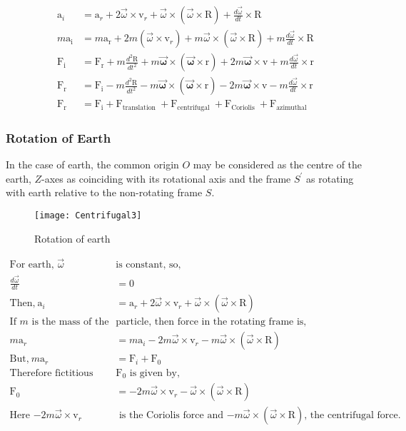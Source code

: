 \begin{align}
\mathrm{a}_{i}&=\mathrm{a}_{r}+2 \vec{\omega} \times \mathrm{v}_{r}+\vec{\omega} \times(\vec{\omega} \times \mathrm{R})+\frac{d \vec{\omega}}{d t} \times \mathrm{R}\\
m \mathrm{a_{i}} &=m \mathrm{a_{r}} +2m (\vec{\omega} \times \mathrm{v}_{r})+ m \vec{\omega} \times(\vec{\omega} \times \mathrm{R})+m \frac{d \vec{\omega}}{d t} \times \mathrm{R}\\
\mathrm{F_{i}} &=\mathrm{F_{r}}+m \frac{d^{2} \mathrm{R}}{d t^{2}}+m \boldsymbol{\vec{\omega}} \times(\boldsymbol{\vec{\omega}} \times \mathrm{r})+2 m \boldsymbol{\vec{\omega}} \times \mathrm{v}+m \frac{d \vec{\omega}}{d t} \times \mathrm{r} \\
\mathrm{F_{r}} &=\mathrm{F_{i}}-m \frac{d^{2} \mathrm{R}}{d t^{2}}-m \boldsymbol{\vec{\omega}} \times(\boldsymbol{\vec{\omega}} \times \mathrm{r})-2 m \boldsymbol{\vec{\omega}} \times \mathrm{v}-m \frac{d \vec{\omega}}{d t} \times \mathrm{r} \\
\mathrm{F_{r}} &=\mathrm{F_{i}} +\mathrm{F}_{\text {translation }}+\mathrm{F}_{\text {centrifugal }}+\mathrm{F}_{\text {Coriolis }}+\mathrm{F}_{\text {azimuthal }}
\end{align}
\subsubsection{Rotation of Earth}
In the case of earth, the common origin $O$ may be considered as the centre of the earth, $Z$-axes as coinciding with its rotational axis and the frame $S^{\prime}$ as rotating with earth relative to the non-rotating frame $S$.
\begin{figure}[H]
	\centering
	\texttt{[image: Centrifugal3]}
	\caption{Rotation of earth}
	\label{Rotation of earth}
\end{figure}
\begin{align*}
\text{For earth, $\vec{\omega}$ }&\text{is constant, so,} \\
\frac{d \vec{\omega}}{d t}&=0 \\
\text{Then,}\ \mathrm{a}_{i}&=\mathrm{a}_{r}+2 \vec{\omega} \times \mathrm{v}_{r}+\vec{\omega} \times(\vec{\omega} \times \mathrm{R})\\
\text{If $m$ is the mass of the }&\text{particle, then force in the rotating frame is,}\\
m \mathrm{a}_{r}&=m \mathrm{a}_{i}-2 m \vec{\omega} \times \mathrm{v}_{r}-m \vec{\omega} \times(\vec{\omega} \times \mathrm{R})\\
\text{But,}\ m \mathrm{a}_{r}&=\mathrm{F}_{i}+\mathrm{F}_{0}\\
\text{Therefore fictitious force }&\text{$\mathrm{F}_{0}$ is given by,}\\
\mathrm{F}_{0}&=-2 m \vec{\omega} \times \mathrm{v}_{r}-\vec{\omega} \times(\vec{\omega} \times \mathrm{R})\\
\text{Here $-2 m \vec{\omega} \times \mathrm{v}_{r}$}&\text{ is the Coriolis force and\  $-m \vec{\omega} \times(\vec{\omega} \times \mathrm{R})$, the centrifugal force.}
\end{align*}
